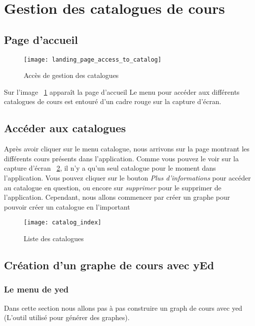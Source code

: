 \section{Gestion des catalogues de cours}
\subsection{Page d'accueil}

\begin{figure}[H]
\centering
\texttt{[image: landing\_page\_access\_to\_catalog]}
\caption{Accès de gestion des catalogues}
\label{fig:landing_page_catalog}
\end{figure}

Sur l'image ~\ref{fig:landing_page_catalog} apparaît la page d'accueil Le menu pour accéder aux différents catalogues de cours est entouré d'un cadre rouge sur la capture d'écran.

\subsection{Accéder aux catalogues}
Après avoir cliquer sur le menu catalogue, nous arrivons sur la page montrant les différents cours présents dans l'application. Comme vous pouvez le voir sur la capture d'écran ~\ref{fig:catalog_index}, il n'y a qu'un seul catalogue pour le moment dans l'application. Vous pouvez cliquer sur le bouton \textit{Plus d'informations} pour accéder au catalogue en question, ou encore sur \textit{supprimer} pour le supprimer de l'application. Cependant, nous allons commencer par créer un graphe pour pouvoir créer un catalogue en l'important\\

\begin{figure}[H]
\centering
\caption{Liste des catalogues}
\label{fig:catalog_index}
\texttt{[image: catalog\_index]}
\end{figure}

\subsection{Création d'un graphe de cours avec yEd}
\subsubsection{Le menu de yed}
Dans cette section nous allons pas à pas construire un graph de cours avec yed (L'outil utilisé pour générer des graphes).

